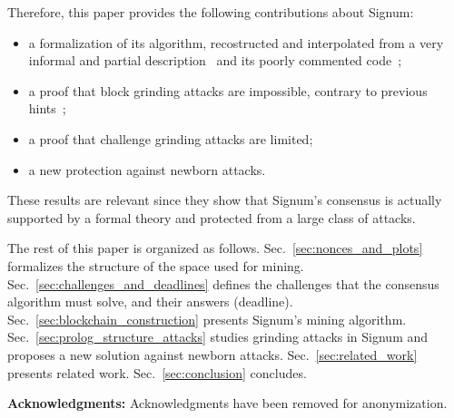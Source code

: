 Therefore, this paper provides the following contributions about Signum:
%
\begin{itemize}
\item a formalization of its algorithm, recostructed and interpolated from a very informal and partial
  description~\cite{SignumPlotting} and its poorly commented code~\cite{SignumSource};
\item a proof that block grinding attacks are impossible, contrary to previous hints~\cite{ParkKFGAP18};
\item a proof that challenge grinding attacks are limited;
\item a new protection against newborn attacks.
\end{itemize}
%
These results are relevant since they show that Signum's consensus
is actually supported by a formal theory and
protected from a large class of attacks.

The rest of this paper is organized as follows.
Sec.~\ref{sec:nonces_and_plots} formalizes the structure of the space used for mining.
Sec.~\ref{sec:challenges_and_deadlines} defines the challenges that the consensus
algorithm must solve, and their answers (deadline).
Sec.~\ref{sec:blockchain_construction} presents Signum's mining algorithm.
Sec.~\ref{sec:prolog_structure_attacks} studies grinding attacks
in Signum and proposes a new solution against newborn attacks.
Sec.~\ref{sec:related_work} presents related work.
Sec.~\ref{sec:conclusion} concludes.

\vspace*{1ex}
\textbf{Acknowledgments:}
Acknowledgments have been removed for anonymization.\newpage
